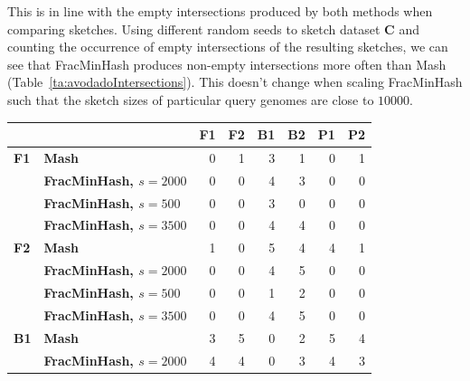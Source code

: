 This is in line with the empty intersections produced by both methods when
comparing sketches. Using different random seeds to sketch dataset \textbf{C}
and counting the occurrence of empty intersections of the resulting sketches, we
can see that FracMinHash produces non-empty intersections more often than Mash
(Table~\ref{ta:avodadoIntersections}). This doesn't change when scaling
FracMinHash such that the sketch sizes of particular query genomes are close to
$10000$.


\begin{table}[]
  \centering
  \begin{tabular}{@{}llrrrrrr@{}}
  \toprule
  \textbf{}   & \textbf{}                      & \textbf{F1} & \textbf{F2} & \textbf{B1} & \textbf{B2} & \textbf{P1} & \textbf{P2} \\ \midrule
  \textbf{F1} & \textbf{Mash}                  & 0           & 1           & 3           & 1           & 0           & 1           \\
  \textbf{}   & \textbf{FracMinHash, $s=2000$} & 0           & 0           & 4           & 3           & 0           & 0           \\
  \textbf{}   & \textbf{FracMinHash, $s=500$}  & 0           & 0           & 3           & 0           & 0           & 0           \\
  \textbf{}   & \textbf{FracMinHash, $s=3500$} & 0           & 0           & 4           & 4           & 0           & 0           \\ \midrule
  \textbf{F2} & \textbf{Mash}                  & 1           & 0           & 5           & 4           & 4           & 1           \\
  \textbf{}   & \textbf{FracMinHash, $s=2000$} & 0           & 0           & 4           & 5           & 0           & 0           \\
  \textbf{}   & \textbf{FracMinHash, $s=500$}  & 0           & 0           & 1           & 2           & 0           & 0           \\
  \textbf{}   & \textbf{FracMinHash, $s=3500$} & 0           & 0           & 4           & 5           & 0           & 0           \\ \midrule
  \textbf{B1} & \textbf{Mash}                  & 3           & 5           & 0           & 2           & 5           & 4           \\
              & \textbf{FracMinHash, $s=2000$} & 4           & 4           & 0           & 3           & 4           & 3           \\

\end{tabular}
\end{table}
